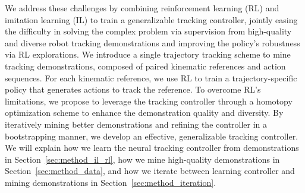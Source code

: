 \textcolor{myblue}{
We address these challenges by combining reinforcement learning (RL) and imitation learning (IL) to train a generalizable tracking controller, jointly easing the difficulty in solving the complex problem via supervision from high-quality and diverse robot tracking demonstrations and improving the policy's robustness via RL explorations. We introduce a single trajectory tracking scheme to mine tracking demonstrations, composed of paired kinematic references and action sequences.
For each kinematic reference, we use RL to train a trajectory-specific policy that generates actions to track the reference. To overcome RL's limitations, we propose to leverage the tracking controller through a homotopy optimization scheme to enhance the demonstration quality and diversity. By iteratively mining better demonstrations and refining the controller in a bootstrapping manner, we develop an effective, generalizable tracking controller.
}
We will explain how we learn the neural tracking controller from demonstrations in Section~\ref{sec:method_il_rl}, how we mine high-quality demonstrations in Section~\ref{sec:method_data}, and how we iterate between learning controller and mining demonstrations in Section~\ref{sec:method_iteration}. 

